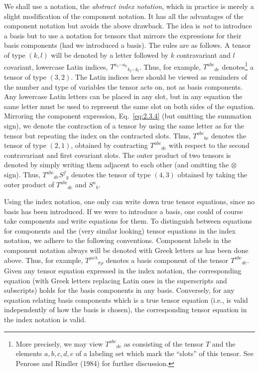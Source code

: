 We shall use a notation, the \emph{abstract index notation}, which in practice is
merely a slight modification of the component notation.  It has all the advantages
of the component notation but avoids the above drawback.  The idea is \emph{not}
to introduce a basis but to use a notation for tensors that mirrors the expressions
for their basis components (had we introduced a basis).  The rules are as follows.
A tensor of type \((k,l)\) will be denoted by a letter followed by \(k\)
contravariant and \(l\) covariant, lowercase Latin indices,
\(T^{a_1\cdots a_k}{}_{b_1\cdots b_l}\).  Thus, for example,
\(T^{abc}{}_{de}\) denotes\footnote{More precisely, we may view \(T^{abc}{}_{de}\)
as consisting of the tensor \(T\) and the elements \(a,b,c,d,e\) of a labeling set
which mark the ``slots'' of this tensor.  See Penrose and Rindler (1984) for further
discussion.} a tensor of type \((3,2)\).  The Latin indices here should be viewed
as reminders of the number and type of variables the tensor acts on, not as basis
components.  Any lowercase Latin letters can be placed in any slot, but in any
equation the same letter must be used to represent the same slot on both sides of
the equation.  Mirroring the component expression, Eq.~\eqref{eq:2.3.4} (but
omitting the summation sign), we denote the contraction of a tensor by using the
same letter as for the tensor but repeating the index on the contracted slots.  Thus,
\(T^{abc}{}_{be}\) denotes the tensor of type \((2,1)\), obtained by contracting
\(T^{abc}{}_{de}\) with respect to the second contravariant and first covariant
slots.  The outer product of two tensors is denoted by simply writing them adjacent
to each other (and omitting the \(\otimes\) sign).  Thus,
\(T^{abc}{}_{de}S^f{}_g\) denotes the tensor of type \((4,3)\) obtained by taking
the outer product of \(T^{abc}{}_{de}\) and \(S^a{}_b\).

Using the index notation, one only can write down true tensor equations, since no
basis has been introduced.  If we were to introduce a basis, one could of course
take components and write equations for them.  To distinguish between equations
for components and the (very similar looking) tensor equations in the index
notation, we adhere to the following conventions.  Component labels in the component
notation always will be denoted with Greek letters as has been done above.  Thus,
for example, \(T^{\mu\nu\lambda}{}_{\sigma\rho}\) denotes a basis component of the
tensor \(T^{abc}{}_{de}\).  Given any tensor equation expressed in the index
notation, the corresponding equation (with Greek letters replacing Latin ones in the
superscripts and subscripts) holds for the basis components in any basis.
Conversely, for any equation relating basis components which is a true tensor
equation (i.e., is valid independently of how the basis is chosen), the corresponding
tensor equation in the index notation is valid.

